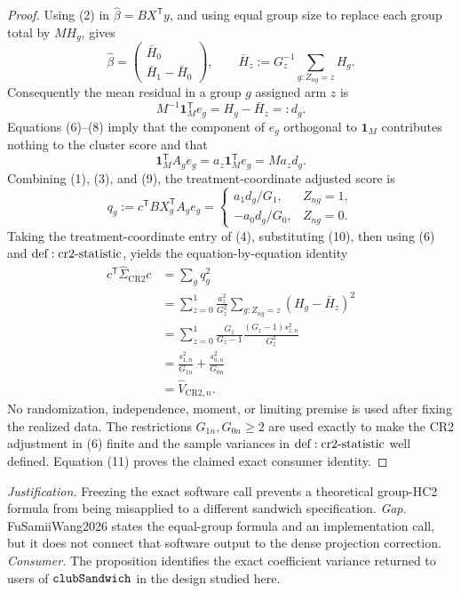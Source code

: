 \documentclass{article}
\begin{document}
\begin{proof}
Using (2) in \(\widehat\beta=BX^{\mathsf T}y\), and using equal group size to replace each group total by \(MH_g\), gives
\[
 \widehat\beta
 =\begin{pmatrix}\bar H_0\\ \bar H_1-\bar H_0\end{pmatrix},
 \qquad
 \bar H_z:=G_z^{-1}\sum_{g:Z_{ng}=z}H_g.
 \tag{7}
\]
Consequently the mean residual in a group \(g\) assigned arm \(z\) is
\[
 M^{-1}\mathbf 1_M^{\mathsf T}e_g=H_g-\bar H_z=:d_g.
 \tag{8}
\]
Equations (6)--(8) imply that the component of \(e_g\) orthogonal to \(\mathbf 1_M\) contributes nothing to the cluster score and that
\[
 \mathbf 1_M^{\mathsf T}A_ge_g
 =a_z\mathbf 1_M^{\mathsf T}e_g
 =Ma_zd_g.
 \tag{9}
\]
Combining (1), (3), and (9), the treatment-coordinate adjusted score is
\[
 q_g:=c^{\mathsf T}BX_g^{\mathsf T}A_ge_g
 =\begin{cases}
 a_1d_g/G_1,&Z_{ng}=1,\\
 -a_0d_g/G_0,&Z_{ng}=0.
 \end{cases}
 \tag{10}
\]
Taking the treatment-coordinate entry of (4), substituting (10), then using (6) and \({\rm def:cr2\text{-}statistic}\), yields the equation-by-equation identity
\[
 \begin{aligned}
 c^{\mathsf T}\widehat\Sigma_{\mathrm{CR2}}c
 &=\sum_gq_g^2\\
 &=\sum_{z=0}^1\frac{a_z^2}{G_z^2}
   \sum_{g:Z_{ng}=z}(H_g-\bar H_z)^2\\
 &=\sum_{z=0}^1
   \frac{G_z}{G_z-1}\frac{(G_z-1)s_{z,n}^2}{G_z^2}\\
 &=\frac{s_{1,n}^2}{G_{1n}}+\frac{s_{0,n}^2}{G_{0n}}\\
 &=\widehat V_{\mathrm{CR2},n}.
 \end{aligned}
 \tag{11}
\]
No randomization, independence, moment, or limiting premise is used after fixing the realized data.  The restrictions \(G_{1n},G_{0n}\ge2\) are used exactly to make the CR2 adjustment in (6) finite and the sample variances in \({\rm def:cr2\text{-}statistic}\) well defined.  Equation (11) proves the claimed exact consumer identity.
\end{proof}
\par\smallskip\noindent \textit{Justification.} Freezing the exact software call prevents a theoretical group-HC2 formula from being misapplied to a different sandwich specification. \textit{Gap.} FuSamiiWang2026 states the equal-group formula and an implementation call, but it does not connect that software output to the dense projection correction. \textit{Consumer.} The proposition identifies the exact coefficient variance returned to users of \({\tt clubSandwich}\) in the design studied here.
\end{document}
